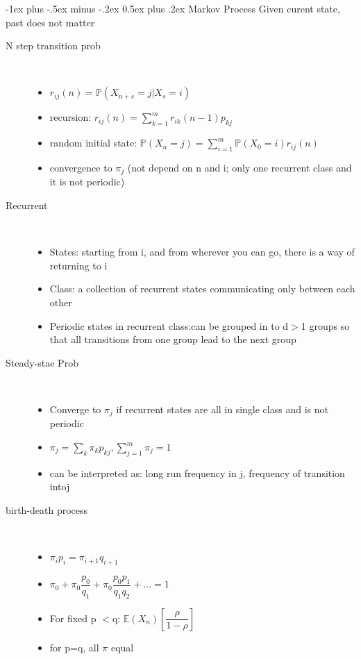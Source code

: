 \documentclass[a4paper, 10pt,landscape]{article}
\makeatletter
\renewcommand{\section}{\@startsection{section}{1}{0mm}%
                                {-1ex plus -.5ex minus -.2ex}%
                                {0.5ex plus .2ex}%
                                {\normalfont\large\bfseries}}
\makeatother
\begin{document}
\begin{multicols*}{4}
\section{Markov Process}
Given curent state, past does not matter
\begin{description}
	\item[N step transition prob]~
		\begin{itemize}
			\item $r_{ij}(n) = \mathbb{P}(X_{n+s}=j | X_s =i)$
			\item recursion: $r_{ij}(n) = \sum_{k=1}^{m}r_{ik}(n-1)p_{kj}$
			\item random initial state: $\mathbb{P}(X_n=j) = \sum_{i=1}^{m}\mathbb{P}(X_0=i)r_{ij}(n)$
			\item convergence to $\pi_{j}$ (not depend on n and i; only one recurrent class and it is not periodic)
		\end{itemize}
	\item[Recurrent]~
		\begin{itemize}
			\item  States: starting from i, and from wherever you can go, there is a way of returning to i
			\item  Class: a collection of recurrent states communicating only between each other
			\item Periodic states in recurrent class:can be grouped in to d$>$1 groups so that all transitions from one group lead to the next group 
		\end{itemize}
	\item[Steady-stae Prob]~
		\begin{itemize}
			\item Converge to $\pi_j$ if recurrent states are all in single class and is not periodic
			\item $\pi_j = \sum_k \pi_k p_{kj},   \sum_{j=1}^m\pi_j = 1$
			\item can be interpreted as: long run frequency in j, frequency of transition intoj
		\end{itemize}
	\item[birth-death process]~
		\begin{itemize}
			\item $\pi_i p_i = \pi_{i+1}q_{i+1}$
			\item $\pi_0 + \pi_0 \dfrac{p_0}{q_1} + \pi_0 \dfrac{p_0 p_1}{q_1 q_2} + ... = 1$
			\item For fixed p $<$q:  $\mathbb{E}(X_n)[\dfrac{\rho}{1-\rho}]$
			\item for p=q, all $\pi$ equal

\end{itemize}
\end{description}
\end{multicols*}
\end{document}
